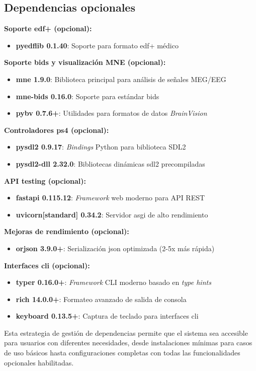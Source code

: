 \subsection{Dependencias opcionales}
\label{subsec:dependencias_opcionales}

\textbf{Soporte \acrshort{edf+} (opcional):}
\begin{itemize}
    \item \textbf{pyedflib 0.1.40}: Soporte para formato \acrshort{edf+} médico~\cite{kemp2003european}
\end{itemize}

\textbf{Soporte \acrshort{bids} y visualización MNE (opcional):}
\begin{itemize}
    \item \textbf{mne 1.9.0}: Biblioteca principal para análisis de señales MEG/EEG~\cite{gramfort2013meg}
    \item \textbf{mne-bids 0.16.0}: Soporte para estándar \acrshort{bids}~\cite{bids}
    \item \textbf{pybv 0.7.6+}: Utilidades para formatos de datos \textit{BrainVision}
\end{itemize}

\textbf{Controladores \acrshort{ps4} (opcional):}
\begin{itemize}
    \item \textbf{pysdl2 0.9.17}: \textit{Bindings} Python para biblioteca SDL2~\cite{pysdl2_docs}
    \item \textbf{pysdl2-dll 2.32.0}: Bibliotecas dinámicas \acrshort{sdl}2 precompiladas
\end{itemize}

\textbf{API testing (opcional):}
\begin{itemize}
    \item \textbf{fastapi 0.115.12}: \textit{Framework} web moderno para API REST~\cite{fastapi_benchmark}
    \item \textbf{uvicorn[standard] 0.34.2}: Servidor \acrshort{asgi} de alto rendimiento
\end{itemize}

\textbf{Mejoras de rendimiento (opcional):}
\begin{itemize}
    \item \textbf{orjson 3.9.0+}: Serialización \acrshort{json} optimizada (2-5x más rápida)~\cite{orjson_docs}
\end{itemize}

\textbf{Interfaces \acrshort{cli} (opcional):}
\begin{itemize}
    \item \textbf{typer 0.16.0+}: \textit{Framework} CLI moderno basado en \textit{type hints}~\cite{typer_docs}
    \item \textbf{rich 14.0.0+}: Formateo avanzado de salida de consola~\cite{rich_docs}
    \item \textbf{keyboard 0.13.5+}: Captura de teclado para interfaces \acrshort{cli}
\end{itemize}

Esta estrategia de gestión de dependencias permite que el sistema sea accesible para usuarios con diferentes necesidades, desde instalaciones mínimas para casos de uso básicos hasta configuraciones completas con todas las funcionalidades opcionales habilitadas.